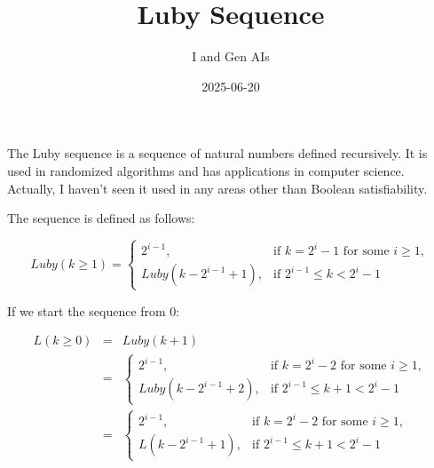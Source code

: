 \documentclass{article}
\title{Luby Sequence}
\author{I and Gen AIs}
\date{2025-06-20}
\begin{document}
\maketitle

The Luby sequence is a sequence of natural numbers defined recursively.
It is used in randomized algorithms and has applications in computer science.
Actually, I haven’t seen it used in any areas other than Boolean satisfiability.

The sequence is defined as follows:

\begin{equation}
Luby(k \ge 1) =
\begin{cases}
2^{i-1}, & \text{if } k = 2^i - 1 \text{ for some } i \geq 1, \\
Luby\left(k - 2^{i-1} + 1\right), & \text{if } 2^{i-1} \leq k < 2^i - 1
\end{cases}
\end{equation}


If we start the sequence from 0:

\begin{eqnarray*}
L(k \ge 0) &=& Luby(k+1) \\
&=&
\begin{cases}
2^{i-1}, & \text{if } k = 2^i -2 \text{ for some } i \geq 1, \\
Luby\left(k - 2^{i-1} + 2\right), & \text{if } 2^{i-1} \leq k + 1 < 2^i - 1
\end{cases}\\
&=&
\begin{cases}
2^{i-1}, & \text{if } k = 2^i -2 \text{ for some } i \geq 1, \\
L\left(k - 2^{i-1} + 1\right), & \text{if } 2^{i-1} \leq k + 1 < 2^i - 1
\end{cases}
\end{eqnarray*}
\end{document}
